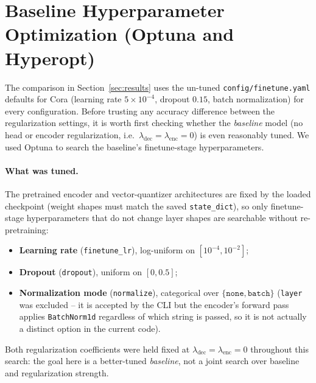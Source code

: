 \documentclass{article}
\begin{document}
\section{Baseline Hyperparameter Optimization (Optuna and Hyperopt)}
\label{sec:optuna}

The comparison in Section~\ref{sec:results} uses the un-tuned
\texttt{config/finetune.yaml} defaults for Cora (learning rate $5\times
10^{-4}$, dropout $0.15$, batch normalization) for every configuration.
Before trusting any accuracy difference between the regularization
settings, it is worth first checking whether the \emph{baseline} model
(no head or encoder regularization, i.e.\ $\lambda_{\text{dec}} =
\lambda_{\text{enc}} = 0$) is even reasonably tuned. We used Optuna to
search the baseline's finetune-stage hyperparameters.

\paragraph{What was tuned.} The pretrained encoder and vector-quantizer
architectures are fixed by the loaded checkpoint (weight shapes must match
the saved \texttt{state\_dict}), so only finetune-stage hyperparameters
that do not change layer shapes are searchable without re-pretraining:
\begin{itemize}
  \item \textbf{Learning rate} (\texttt{finetune\_lr}), log-uniform on
        $[10^{-4}, 10^{-2}]$;
  \item \textbf{Dropout} (\texttt{dropout}), uniform on $[0, 0.5]$;
  \item \textbf{Normalization mode} (\texttt{normalize}), categorical over
        $\{\texttt{none}, \texttt{batch}\}$ (\texttt{layer} was excluded --
        it is accepted by the CLI but the encoder's forward pass applies
        \texttt{BatchNorm1d} regardless of which string is passed, so it is
        not actually a distinct option in the current code).
\end{itemize}
Both regularization coefficients were held fixed at $\lambda_{\text{dec}}
= \lambda_{\text{enc}} = 0$ throughout this search: the goal here is a
better-tuned \emph{baseline}, not a joint search over baseline and
regularization strength.
\end{document}
